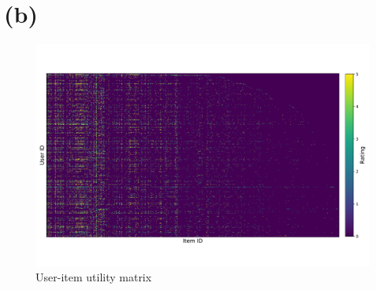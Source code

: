 \section*{(b)}


\begin{figure}[H]
\centering
\includegraphics[width=1.0\textwidth]{./figures/utility.pdf}
\caption{\label{fig:utility} User-item utility matrix}
\end{figure}

